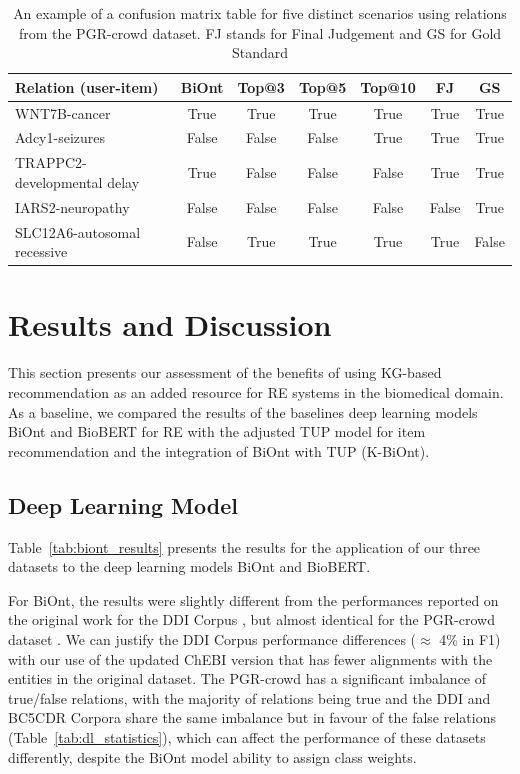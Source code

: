 \begin{table}[h]
\centering
  \caption[Confusion Matrix Example for Different K-BiOnt Scenarios]{An example of a confusion matrix table for five distinct scenarios using relations from the PGR-crowd dataset. FJ stands for Final Judgement and GS for Gold Standard}
  \begin{tabular}{lcccccc}
    \hline
    Relation (user-item) & BiOnt & Top@3 & Top@5 & Top@10 & FJ & GS\\
    \hline
    WNT7B-cancer & True & True & True & True & True & True \\
    \hline
    Adcy1-seizures & False & False & False & True & True & True \\
    \hline
    TRAPPC2-developmental delay & True & False & False & False & True & True \\
    \hline
    \rowcolor[gray]{0.9}
    IARS2-neuropathy & False & False & False & False & False & True \\
    \hline
    \rowcolor[gray]{0.9}
    SLC12A6-autosomal recessive & False & True & True & True & True & False \\
    \hline
  \end{tabular}
    \label{tab:cross_validation}
\end{table}

\section{Results and Discussion}

This section presents our assessment of the benefits of using KG-based recommendation as an added resource for RE systems in the biomedical domain. As a baseline, we compared the results of the baselines deep learning models BiOnt \citep{sousa2020biont} and BioBERT \citep{lee2020biobert} for RE with the adjusted TUP model \citep{10.1145/3308558.3313705} for item recommendation and the integration of BiOnt with TUP (K-BiOnt).


\subsection{Deep Learning Model}

Table~\ref{tab:biont_results} presents the results for the application of our three datasets to the deep learning models BiOnt and BioBERT. 

For BiOnt, the results were slightly different from the performances reported on the original work for the DDI Corpus \citep{herrero2013ddi}, but almost identical for the PGR-crowd dataset \citep{sousa2020hybrid}. We can justify the DDI Corpus performance differences ($\approx$ 4\% in F1) with our use of the updated ChEBI version that has fewer alignments with the entities in the original dataset. The PGR-crowd has a significant imbalance of true/false relations, with the majority of relations being true and the DDI and BC5CDR Corpora share the same imbalance but in favour of the false relations (Table~\ref{tab:dl_statistics}), which can affect the performance of these datasets differently, despite the BiOnt model ability to assign class weights.

